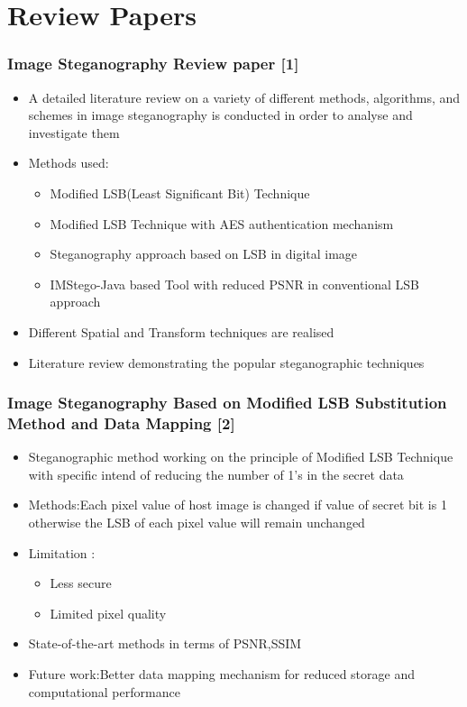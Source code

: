 \documentclass{beamer} %
\theoremstyle{definition} %
\begin{document}
\section{Review Papers}
\begin{frame}
\frametitle{Image Steganography Review paper [1]}
\begin{itemize}
	\item{ A detailed literature review on a
		variety of different methods, algorithms, and schemes in image steganography is conducted in order to analyse and
		investigate them
	}
   \item{Methods used:}
   \begin{itemize}
   	\item{Modified LSB(Least Significant Bit) Technique }
   	\item{Modified LSB Technique with AES authentication mechanism  }
   	\item{Steganography approach based on LSB in digital image  }
   	\item{IMStego-Java based Tool with reduced PSNR in conventional LSB approach  }
   \end{itemize}
   \item{ Different Spatial and Transform techniques are realised  }
   \item{Literature review demonstrating the popular steganographic techniques }
\end{itemize}
\end{frame}

\begin{frame}
\frametitle{Image Steganography Based on Modified LSB Substitution Method and Data Mapping [2]}
\begin{itemize}
	\item{Steganographic method working on the principle of Modified LSB Technique with specific intend of reducing the number of 1's in the secret data  }
	\item{Methods:Each pixel value of host image is changed if value of secret bit is 1 otherwise the LSB of each pixel value will remain unchanged }
	\item{Limitation :}
	   \begin{itemize}
	   	\item {Less secure}
	   	\item {Limited pixel quality}
	   \end{itemize}
    \item{State-of-the-art methods in terms of PSNR,SSIM  } 
	\item{Future work:Better data mapping mechanism for reduced storage and computational performance  }
\end{itemize}
\end{frame}
\end{document}
